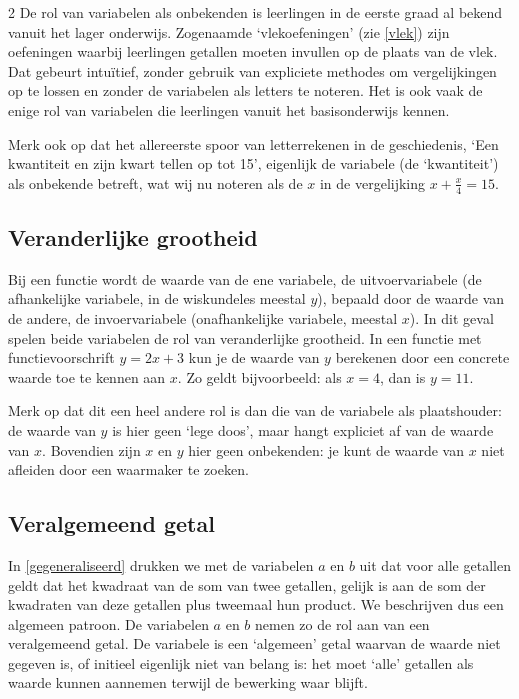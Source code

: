 \begin{multicols}{2}
De rol van variabelen als onbekenden is leerlingen in de eerste graad al bekend vanuit het lager onderwijs. Zogenaamde ‘vlekoefeningen’ (zie \autoref{vlek}) zijn oefeningen waarbij leerlingen getallen moeten invullen op de plaats van de vlek. Dat gebeurt intuïtief, zonder gebruik van expliciete methodes om vergelijkingen op te lossen en zonder de variabelen als letters te noteren. Het is ook vaak de enige rol van variabelen die leerlingen vanuit het basisonderwijs kennen.

Merk ook op dat het allereerste spoor van letterrekenen in de geschiedenis, ‘Een kwantiteit en zijn kwart tellen op tot 15’, eigenlijk de variabele (de ‘kwantiteit’) als onbekende betreft, wat wij nu noteren als de $x$ in de vergelijking $x + \frac{x}{4} = 15.$
\subsection{Veranderlijke grootheid}
Bij een functie wordt de waarde van de ene variabele, de uitvoervariabele (de afhankelijke variabele, in de wiskundeles meestal $y$), bepaald door de waarde van de andere, de invoervariabele (onafhankelijke variabele, meestal $x$). In dit geval spelen beide variabelen de rol van veranderlijke grootheid. In een functie met functievoorschrift $y = 2x + 3$ kun je de waarde van $y$ berekenen door een concrete waarde toe te kennen aan $x$. Zo geldt bijvoorbeeld: als $x=4$, dan is $y=11$.

Merk op dat dit een heel andere rol is dan die van de variabele als plaatshouder: de waarde van $y$ is hier geen ‘lege doos’, maar hangt expliciet af van de waarde van $x$. Bovendien zijn $x$ en $y$ hier geen onbekenden: je kunt de waarde van $x$ niet afleiden door een waarmaker te zoeken.

\subsection{Veralgemeend getal}
In \autoref{gegeneraliseerd} drukken we met de variabelen $a$ en $b$ uit dat voor alle getallen geldt dat het kwadraat van de som van twee getallen, gelijk is aan de som der kwadraten van deze getallen plus tweemaal hun product. We beschrijven dus een algemeen patroon. De variabelen $a$ en $b$ nemen zo de rol aan van een veralgemeend getal. De variabele is een `algemeen' getal waarvan de waarde niet gegeven is, of initieel eigenlijk niet van belang is: het moet `alle' getallen als waarde kunnen aannemen terwijl de bewerking waar blijft.
\end{multicols}
